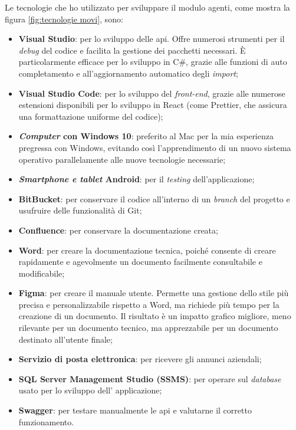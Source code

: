 Le tecnologie che ho utilizzato per sviluppare il modulo agenti, come mostra la figura \ref{fig:tecnologie movi}, sono:
\begin{itemize}
      \item \textbf{Visual Studio}: per lo sviluppo delle \gls{api}. Offre numerosi strumenti per
            il \textit{debug} del codice e facilita la gestione dei pacchetti necessari.
            È particolarmente efficace per lo sviluppo in C\#, grazie alle funzioni di auto completamento
            e all'aggiornamento automatico degli \textit{import};
      \item \textbf{Visual Studio Code}: per lo sviluppo del \textit{front-end}, grazie alle numerose estensioni
            disponibili per lo sviluppo in React (come Prettier, che assicura una formattazione uniforme
            del codice);
      \item \textbf{\textit{Computer} con Windows 10}: preferito al Mac per la mia esperienza pregressa
            con Windows, evitando così l'apprendimento di un nuovo sistema operativo parallelamente alle nuove tecnologie necessarie;
      \item \textbf{\textit{Smartphone e tablet} Android}: per il \textit{testing} dell'applicazione;
      \item \textbf{BitBucket}: per conservare il codice all'interno di un \textit{branch} del progetto e usufruire delle 
            funzionalità di Git;
      \item \textbf{Confluence}: per conservare la documentazione creata;
      \item \textbf{Word}: per creare la documentazione tecnica, poiché consente di creare rapidamente e agevolmente un
            documento facilmente consultabile e modificabile;
      \item \textbf{Figma}: per creare il manuale utente. Permette una gestione dello stile più precisa e personalizzabile
            rispetto a Word, ma richiede più tempo per la creazione di un documento. Il risultato è un impatto grafico migliore,
            meno rilevante per un documento tecnico, ma apprezzabile per un documento destinato all'utente finale;
      \item \textbf{Servizio di posta elettronica}: per ricevere gli annunci aziendali;
      \item \textbf{SQL Server Management Studio (SSMS)}: per operare sul \textit{database} usato per lo sviluppo dell'
      applicazione;
      \item \textbf{Swagger}: per testare manualmente le \gls{api} e valutarne il corretto funzionamento.
\end{itemize}
